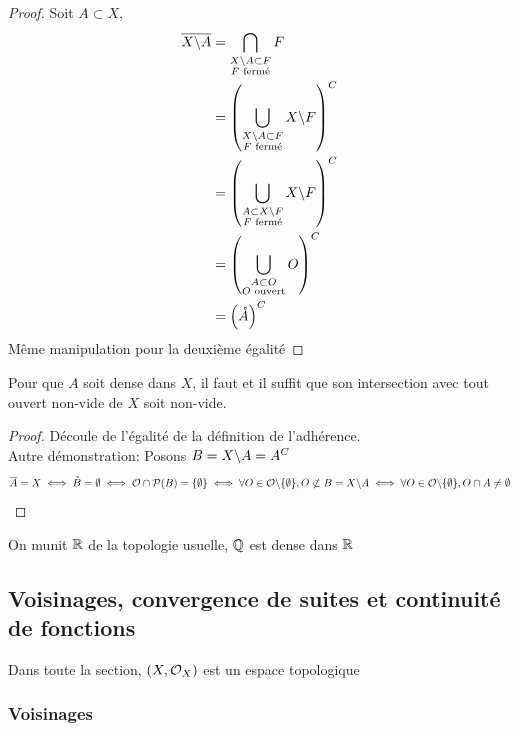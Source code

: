 \documentclass[]{report}
\begin{document}
    \begin{proof}{}{}
        Soit $A \subset X$,
        \begin{align*}
            \overline{X\backslash A}&=\bigcap_{\substack{X\backslash A\subset F\\ F\text{ fermé}}}F\\
            &=\left(\bigcup_{\substack{X\backslash A\subset F\\ F\text{ fermé}}}X\backslash F\right)^C\\
            &=\left(\bigcup_{\substack{A\subset X\backslash F\\ F\text{ fermé}}}X\backslash F\right)^C\\
            &=\left(\bigcup_{\substack{A\subset O\\ O\text{ ouvert}}}O\right)^C\\
            &=\left(\mathring{A}\right)^C
        \end{align*}
        Même manipulation pour la deuxième égalité
    \end{proof}

    \begin{cor}{}{}
        Pour que $A$ soit dense dans $X$, il faut et il suffit que son intersection avec tout ouvert non-vide de $X$ soit non-vide.
    \end{cor}

    \begin{proof}{}{}
        Découle de l'égalité de la définition de l'adhérence.\\
        Autre démonstration: Posons $B=X\backslash A=A^C$\\
        \[\overline{A}=X\iff\mathring{B}=\emptyset\iff\mathcal{O}\cap\mathcal{P}(B)=\{\emptyset\}\iff\forall O\in\mathcal{O}\backslash\{\emptyset\},O\not\subset B=X\backslash A\iff\forall O\in\mathcal{O}\backslash\{\emptyset\},O\cap A\neq \emptyset\]
    \end{proof}

    \begin{ex}{}{}
        On munit $\mathbb{R}$ de la topologie usuelle, $\mathbb{Q}$ est dense dans $\mathbb{R}$
    \end{ex}

    \subsection{Voisinages, convergence de suites et continuité de fonctions}

    Dans toute la section, $(X,\mathcal{O}_X)$ est un espace topologique

    \subsubsection*{Voisinages}
\end{document}
